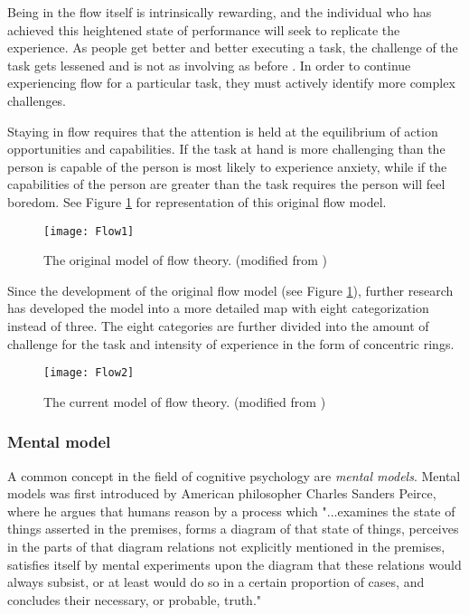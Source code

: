 Being in the flow itself is intrinsically rewarding, and the individual who has achieved this heightened state of performance will seek to replicate the experience. As people get better and better executing a task, the challenge of the task gets lessened and is not as involving as before \cite{Nakamura2005}. In order to continue experiencing flow for a particular task, they must actively identify more complex challenges.

Staying in flow requires that the attention is held at the equilibrium of action opportunities and capabilities. If the task at hand is more challenging than the person is capable of the person is most likely to experience anxiety, while if the capabilities of the person are greater than the task requires the person will feel boredom. See Figure \ref{fig:Flow-1} for representation of this original flow model.

\begin{figure}[h]
  \centering
    \texttt{[image: Flow1]}
  \caption{The original model of flow theory. (modified from \cite{Csikszentmihalyi2000})}
  \label{fig:Flow-1}
\end{figure}

Since the development of the original flow model (see Figure \ref{fig:Flow-1}), further research has developed the model into a more detailed map with eight categorization instead of three. The eight categories are further divided into the amount of challenge for the task and intensity of experience in the form of concentric rings.

\begin{figure}[h]
  \centering
    \texttt{[image: Flow2]}
  \caption{The current model of flow theory. (modified from \cite{Csikszentmihalyi1997})}
  \label{fig:Flow-2}
\end{figure}


\subsubsection{Mental model}
A common concept in the field of cognitive psychology are \textit{mental models}. Mental models was first introduced by American philosopher Charles Sanders Peirce, where he argues that humans reason by a process which
"...examines the state of things
asserted in the premises, forms a diagram of that state of things, perceives in the parts of that diagram relations not explicitly mentioned in the premises, satisfies itself by mental experiments upon the diagram that these relations would always subsist, or at least would do so in a certain proportion of cases, and concludes their necessary, or probable, truth." \cite{Pierce1974}

